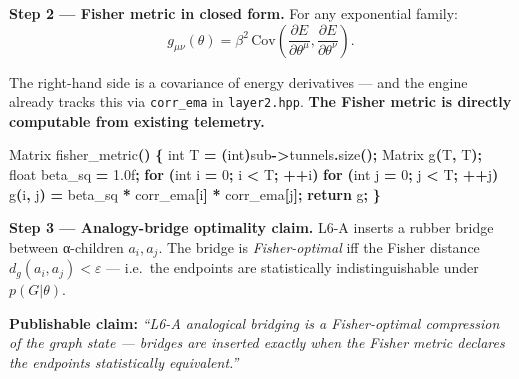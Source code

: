 \documentclass[
  11pt,
  a4paper,
]{article}
\newenvironment{Shaded}{\begin{snugshade}}{\end{snugshade}}
\newcommand{\BuiltInTok}[1]{#1}
\newcommand{\ControlFlowTok}[1]{\textcolor[rgb]{0.13,0.29,0.53}{\textbf{#1}}}
\newcommand{\DataTypeTok}[1]{\textcolor[rgb]{0.13,0.29,0.53}{#1}}
\newcommand{\DecValTok}[1]{\textcolor[rgb]{0.00,0.00,0.81}{#1}}
\newcommand{\FloatTok}[1]{\textcolor[rgb]{0.00,0.00,0.81}{#1}}
\newcommand{\NormalTok}[1]{#1}
\newcommand{\OperatorTok}[1]{\textcolor[rgb]{0.81,0.36,0.00}{\textbf{#1}}}
\begin{document}
\textbf{Step 2 --- Fisher metric in closed form.} For any exponential
family: \[
g_{\mu\nu}(\theta) = \beta^2 \, \mathrm{Cov}\!\left(\frac{\partial E}{\partial \theta^\mu}, \frac{\partial E}{\partial \theta^\nu}\right).
\]

The right-hand side is a covariance of energy derivatives --- and the
engine already tracks this via \texttt{corr\_ema} in
\texttt{layer2.hpp}. \textbf{The Fisher metric is directly computable
from existing telemetry.}

\begin{Shaded}
\begin{Highlighting}[]
\NormalTok{Matrix fisher\_metric}\OperatorTok{()} \OperatorTok{\{}
    \DataTypeTok{int}\NormalTok{ T }\OperatorTok{=} \OperatorTok{(}\DataTypeTok{int}\OperatorTok{)}\NormalTok{sub}\OperatorTok{{-}\textgreater{}}\NormalTok{tunnels}\OperatorTok{.}\NormalTok{size}\OperatorTok{();}
\NormalTok{    Matrix g}\OperatorTok{(}\NormalTok{T}\OperatorTok{,}\NormalTok{ T}\OperatorTok{);}
    \DataTypeTok{float}\NormalTok{ beta\_sq }\OperatorTok{=} \FloatTok{1.0}\BuiltInTok{f}\OperatorTok{;}
    \ControlFlowTok{for} \OperatorTok{(}\DataTypeTok{int}\NormalTok{ i }\OperatorTok{=} \DecValTok{0}\OperatorTok{;}\NormalTok{ i }\OperatorTok{\textless{}}\NormalTok{ T}\OperatorTok{;} \OperatorTok{++}\NormalTok{i}\OperatorTok{)}
        \ControlFlowTok{for} \OperatorTok{(}\DataTypeTok{int}\NormalTok{ j }\OperatorTok{=} \DecValTok{0}\OperatorTok{;}\NormalTok{ j }\OperatorTok{\textless{}}\NormalTok{ T}\OperatorTok{;} \OperatorTok{++}\NormalTok{j}\OperatorTok{)}
\NormalTok{            g}\OperatorTok{(}\NormalTok{i}\OperatorTok{,}\NormalTok{ j}\OperatorTok{)} \OperatorTok{=}\NormalTok{ beta\_sq }\OperatorTok{*}\NormalTok{ corr\_ema}\OperatorTok{[}\NormalTok{i}\OperatorTok{]} \OperatorTok{*}\NormalTok{ corr\_ema}\OperatorTok{[}\NormalTok{j}\OperatorTok{];}
    \ControlFlowTok{return}\NormalTok{ g}\OperatorTok{;}
\OperatorTok{\}}
\end{Highlighting}
\end{Shaded}

\textbf{Step 3 --- Analogy-bridge optimality claim.} L6-A inserts a
rubber bridge between α-children \(a_i, a_j\). The bridge is
\emph{Fisher-optimal} iff the Fisher distance
\(d_g(a_i, a_j) < \varepsilon\) --- i.e.~the endpoints are statistically
indistinguishable under \(p(G|\theta)\).

\textbf{Publishable claim:} \emph{``L6-A analogical bridging is a
Fisher-optimal compression of the graph state --- bridges are inserted
exactly when the Fisher metric declares the endpoints statistically
equivalent.''}
\end{document}
